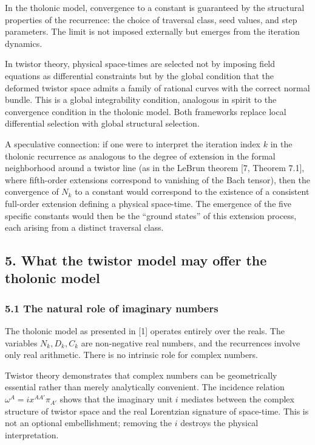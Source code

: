 \documentclass[
  11pt,
  letterpaper,
]{article}
\begin{document}
In the tholonic model, convergence to a constant is guaranteed by the
structural properties of the recurrence: the choice of traversal class,
seed values, and step parameters. The limit is not imposed externally
but emerges from the iteration dynamics.

In twistor theory, physical space-times are selected not by imposing
field equations as differential constraints but by the global condition
that the deformed twistor space admits a family of rational curves with
the correct normal bundle. This is a global integrability condition,
analogous in spirit to the convergence condition in the tholonic model.
Both frameworks replace local differential selection with global
structural selection.

A speculative connection: if one were to interpret the iteration index
\(k\) in the tholonic recurrence as analogous to the degree of extension
in the formal neighborhood around a twistor line (as in the LeBrun
theorem {[}7, Theorem 7.1{]}, where fifth-order extensions correspond to
vanishing of the Bach tensor), then the convergence of \(N_k\) to a
constant would correspond to the existence of a consistent full-order
extension defining a physical space-time. The emergence of the five
specific constants would then be the ``ground states'' of this extension
process, each arising from a distinct traversal class.

\subsection{5. What the twistor model may offer the tholonic
model}\label{what-the-twistor-model-may-offer-the-tholonic-model}

\subsubsection{5.1 The natural role of imaginary
numbers}\label{the-natural-role-of-imaginary-numbers}

The tholonic model as presented in {[}1{]} operates entirely over the
reals. The variables \(N_k, D_k, C_k\) are non-negative real numbers,
and the recurrences involve only real arithmetic. There is no intrinsic
role for complex numbers.

Twistor theory demonstrates that complex numbers can be geometrically
essential rather than merely analytically convenient. The incidence
relation \(\omega^A = i x^{AA'} \pi_{A'}\) shows that the imaginary unit
\(i\) mediates between the complex structure of twistor space and the
real Lorentzian signature of space-time. This is not an optional
embellishment; removing the \(i\) destroys the physical interpretation.
\end{document}
